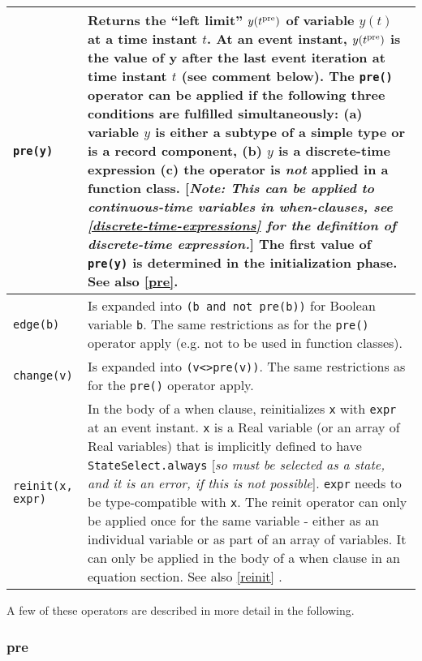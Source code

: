 \begin{longtable}{|p{5cm}|p{8cm}|}
\lstinline!pre(y)! & Returns the ``left limit'' $y(t\textsuperscript{pre})$ of
variable $y(t)$ at a time instant $t$. At an event instant,
$y(t\textsuperscript{pre})$ is the value of y after the last event
iteration at time instant $t$ (see comment below). The \lstinline!pre()! operator can
be applied if the following three conditions are fulfilled
simultaneously: (a) variable $y$ is either a subtype of a simple type or
is a record component, (b) $y$ is a discrete-time expression (c) the
operator is \emph{not} applied in a function class. {[}\emph{Note: This
can be applied to continuous-time variables in when-clauses, see
\autoref{discrete-time-expressions} for the definition of discrete-time expression.}{]}
The first value of \lstinline!pre(y)! is determined in the initialization phase. See
also \autoref{pre}.\\ \hline

\lstinline!edge(b)! & Is expanded into \lstinline!(b and not pre(b))! for Boolean variable
\lstinline!b!. The same restrictions as for the \lstinline!pre()! operator apply (e.g. not to be
used in function classes).\\ \hline

\lstinline!change(v)! & Is expanded into \lstinline!(v<>pre(v))!. The
same restrictions as for the \lstinline!pre()! operator apply.\\ \hline

\lstinline!reinit(x, expr)! & In the body of a when clause, reinitializes \lstinline!x! with
\lstinline!expr! at an event instant. \lstinline!x! is a Real variable (or an array of Real variables) that is implicitly defined to have \lstinline!StateSelect.always!
{[}\emph{so must be selected as a state, and it is an error, if
this is not possible}{]}. \lstinline!expr! needs to be type-compatible with \lstinline!x!. The
reinit operator can only be applied once for the same variable - either
as an individual variable or as part of an array of variables. It can
only be applied in the body of a when clause in an equation section. See
also \autoref{reinit} .\\ \hline

\end{longtable}

A few of these operators are described in more detail in the following.

\subsubsection{pre}

